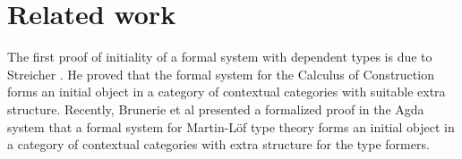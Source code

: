 \documentclass{lmcs}
\newcommand{\s}{\mathrm{s}}
\newcommand{\Ta}{\mathrm{T}}
\newcommand{\Tan}{\Ta_n}
\newcommand{\Un}{\U_n}
\begin{document}
%
%
\section{Related work}

The first proof of initiality of a formal system with dependent types is due to Streicher \cite{streicher:semtt}. He proved that the formal system for the Calculus of Construction forms an initial object in a category of contextual categories with suitable extra structure. Recently, Brunerie et al \cite{brunerie:initiality} presented a formalized proof in the Agda system that a formal system for Martin-Löf type theory forms an initial object in a category of contextual categories with extra structure for
the type formers.
\end{document}
